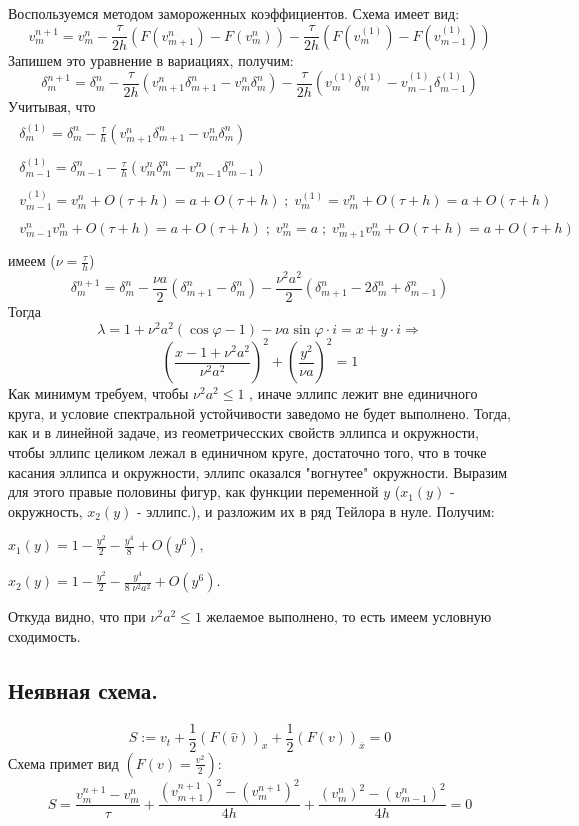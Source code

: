 \documentclass[a4paper,12pt]{article}
\begin{document}
Воспользуемся методом замороженных коэффициентов. Схема имеет вид:
\[
    v^{n+1}_m=v^n_m-\frac{\tau}{2h}(F(v^n_{m+1})-F(v^n_m))-\frac{\tau}{2h}(F(v^{(1)}_m)-F(v^{(1)}_{m-1}))
\]
Запишем это уравнение в вариациях, получим:
\[
    \delta^{n+1}_m=\delta_m^n-\frac{\tau}{2h}(v^n_{m+1}\delta^n_{m+1}-v^n_m\delta^n_m)-\frac{\tau}{2h}(v^{(1)}_m\delta^{(1)}_m-v^{(1)}_{m-1}\delta^{(1)}_{m-1})
\]
Учитывая, что 
\begin{align*}
\begin{array}{l}
    \delta^{(1)}_m=\delta^{n}_m-\frac{\tau}{h}(v^n_{m+1}\delta^n_{m+1}-v^n_m\delta^n_m)\\
    \\
    \delta^{(1)}_{m-1}=\delta^{n}_{m-1}-\frac{\tau}{h}(v^n_{m}\delta^n_{m}-v^n_{m-1}\delta^n_{m-1})\\
    \\
    v^{(1)}_{m-1}=v^n_m+O(\tau+h)=a+O(\tau+h) \; ; \; v^{(1)}_{m} =v^n_m+O(\tau+h)=a+O(\tau+h) \\
    \\
    v^n_{m-1}v^n_m+O(\tau+h)=a+O(\tau+h)   \; ; \;   v^n_m=a    \; ; \;   v^n_{m+1}v^n_m+O(\tau+h)=a+O(\tau+h)\\
\end{array}
\end{align*}
имеем ($\nu=\frac{\tau}{h}$)
\[
    \delta^{n+1}_m=\delta_m^n-\frac{\nu a}{2}(\delta^n_{m+1}-\delta^n_m)-\frac{\nu^2 a^2}{2}(\delta^{n}_{m+1}-2\delta^{n}_{m}+\delta^{n}_{m-1})
\]
Тогда
\[
    \lambda=1+\nu^2 a^2 (\cos{\varphi}-1)-\nu a \sin{\varphi} \cdot i = x+y\cdot i \Rightarrow  
\]
\[
\left(\frac{x-1+\nu^2 a^2}{\nu^2 a^2}\right)^2+\left(\frac{y^2}{\nu a}\right)^2=1
\]
Как минимум требуем, чтобы $\nu^2 a^2 \leqslant 1$ , иначе эллипс лежит вне единичного круга, и условие спектральной устойчивости заведомо не будет выполнено. Тогда, как и в линейной задаче, из геометричесских свойств эллипса и окружности, чтобы эллипс целиком лежал в единичном круге, достаточно того, что в точке касания эллипса и окружности, эллипс оказался "вогнутее" окружности. Выразим для этого правые половины фигур, как функции переменной $y$ ($x_1(y)$ - окружность, $x_2(y)$ - эллипс.),  и разложим их в ряд Тейлора в нуле. Получим: 

$
x_1(y)=1-\frac{y^2}{2}-\frac{y^4}{8}+O(y^6) ,
$

$
x_2(y)=1-\frac{y^2}{2}-\frac{y^4}{8 \; \nu^2 a^2}+O(y^6).
$ 

Откуда видно, что при $\nu^2 a^2 \leqslant 1$ желаемое выполнено, то есть имеем условную сходимость.
\subsection{Неявная схема.}
\[
   S:=v_t+\frac12 (F(\hat{v}))_x+\frac12 (F(v))_\overline{x}=0 
\]
Схема примет вид $(F(v)=\frac{v^2}{2})$:
\[
S=\frac{v^{n+1}_m-v^n_m}{\tau}+\frac{(v^{n+1}_{m+1})^2-(v^{n+1}_m)^2}{4h}+\frac{(v^n_m)^2-(v^n_{m-1})^2}{4h}=0
\]
\end{document}
